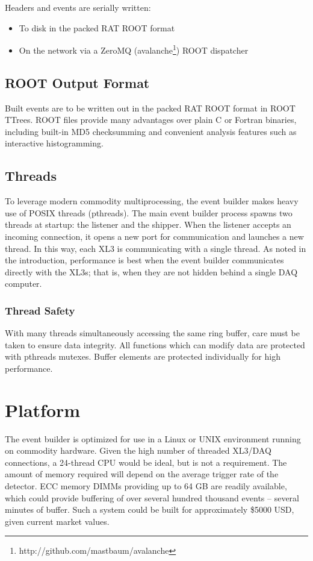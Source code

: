 \documentclass[11pt,twocolumn]{article}
\begin{document}
Headers and events are serially written:
\begin{itemize}
\item To disk in the packed RAT ROOT format
\item On the network via a ZeroMQ (avalanche\footnote{http://github.com/mastbaum/avalanche}) ROOT dispatcher
\end{itemize}

\subsection{ROOT Output Format}
Built events are to be written out in the packed RAT ROOT format in ROOT TTrees. ROOT files provide many advantages over plain C or Fortran binaries, including built-in MD5 checksumming and convenient analysis features such as interactive histogramming.

\subsection{Threads}
To leverage modern commodity multiprocessing, the event builder makes heavy use of POSIX threads (pthreads). The main event builder process spawns two threads at startup: the listener and the shipper. When the listener accepts an incoming connection, it opens a new port for communication and launches a new thread. In this way, each XL3 is communicating with a single thread. As noted in the introduction, performance is best when the event builder communicates directly with the XL3s; that is, when they are not hidden behind a single DAQ computer.

\subsubsection{Thread Safety}
With many threads simultaneously accessing the same ring buffer, care must be taken to ensure data integrity. All functions which can modify data are protected with pthreads mutexes. Buffer elements are protected individually for high performance.

\section{Platform}
The event builder is optimized for use in a Linux or UNIX environment running on commodity hardware. Given the high number of threaded XL3/DAQ connections, a 24-thread CPU would be ideal, but is not a requirement. The amount of memory required will depend on the average trigger rate of the detector. ECC memory DIMMs providing up to 64 GB are readily available, which could provide buffering of over several hundred thousand events -- several minutes of buffer. Such a system could be built for approximately \$5000 USD, given current market values.
\end{document}
